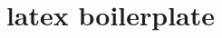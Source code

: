 \documentclass{article}
\begin{document}
\title{latex boilerplate}
\author{}
\date{}

\maketitle
\end{document}
